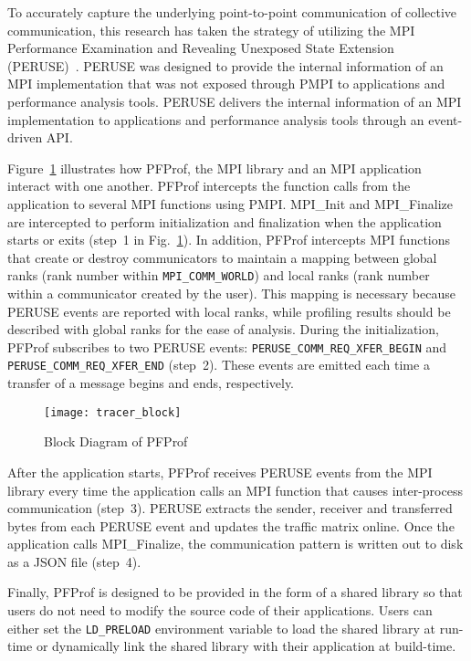 To accurately capture the underlying point-to-point communication of
collective communication, this research has taken the strategy of utilizing
the MPI Performance Examination and Revealing Unexposed State Extension
(PERUSE)~\autocite{Jones2006}. PERUSE was designed to provide the internal
information of an MPI implementation that was not exposed through PMPI to
applications and performance analysis tools. PERUSE delivers the internal
information of an MPI implementation to applications and performance analysis
tools through an event-driven API\@.

Figure~\ref{fig:profiler-block} illustrates how PFProf, the MPI library and an
MPI application interact with one another. PFProf intercepts the function
calls from the application to several MPI functions using PMPI\@. MPI\_Init
and MPI\_Finalize are intercepted to perform initialization and finalization
when the application starts or exits (step~1 in
Fig.~\ref{fig:profiler-block}). In addition, PFProf intercepts MPI functions
that create or destroy communicators to maintain a mapping between global
ranks (rank number within \lstinline!MPI_COMM_WORLD!) and local ranks (rank
number within a communicator created by the user). This mapping is necessary
because PERUSE events are reported with local ranks, while profiling results
should be described with global ranks for the ease of analysis. During the
initialization, PFProf subscribes to two PERUSE events:
\lstinline!PERUSE_COMM_REQ_XFER_BEGIN! and
\lstinline!PERUSE_COMM_REQ_XFER_END! (step~2). These events are emitted each
time a transfer of a message begins and ends, respectively.

\begin{figure}
    \centering
    \texttt{[image: tracer\_block]}
    \caption{Block Diagram of PFProf}%
    \label{fig:profiler-block}
\end{figure}

After the application starts, PFProf receives PERUSE events from the MPI
library every time the application calls an MPI function that causes
inter-process communication (step~3). PERUSE extracts the sender, receiver and
transferred bytes from each PERUSE event and updates the traffic matrix
online. Once the application calls MPI\_Finalize, the communication pattern is
written out to disk as a JSON file (step~4).

Finally, PFProf is designed to be provided in the form of a shared library so
that users do not need to modify the source code of their applications. Users
can either set the \lstinline!LD_PRELOAD! environment variable to load the
shared library at run-time or dynamically link the shared library with their
application at build-time.

